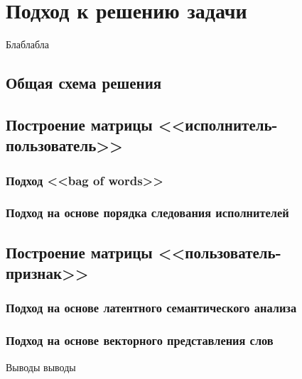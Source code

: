 \chapter{Подход к решению задачи}
\label{ch:problem_solving}

Блаблабла

\section{Общая схема решения}

\section{Построение матрицы <<исполнитель-пользователь>>}

\subsection{Подход <<bag of words>>}

\subsection{Подход на основе порядка следования исполнителей}

\section{Построение матрицы <<пользователь-признак>>}

\subsection{Подход на основе латентного семантического анализа}

\subsection{Подход на основе векторного представления слов}

\chapterconclusion

Выводы выводы 
